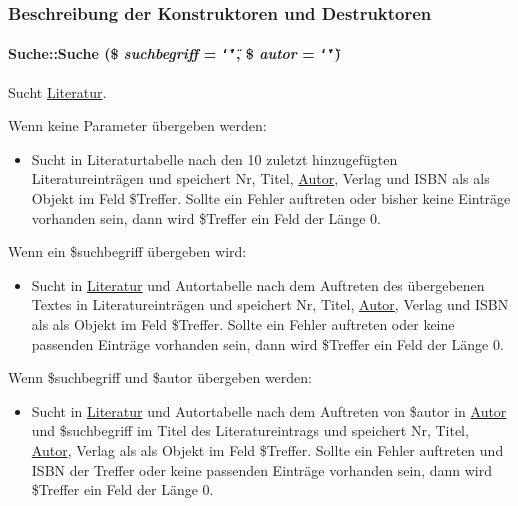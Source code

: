 \subsubsection{Beschreibung der Konstruktoren und Destruktoren}
\hypertarget{classSuche_277cd59d3689d6f0875d114be0024935}{
\paragraph[Suche]{\setlength{\rightskip}{0pt plus 5cm}Suche::Suche (\$ {\em suchbegriff} = {\tt \char`\"{}\char`\"{}}, \$ {\em autor} = {\tt \char`\"{}\char`\"{}})}\hfill}
\label{classSuche_277cd59d3689d6f0875d114be0024935}


Sucht \hyperlink{classLiteratur}{Literatur}. 

Wenn keine Parameter übergeben werden:\begin{itemize}
\item Sucht in Literaturtabelle nach den 10 zuletzt hinzugefügten Literatureinträgen und speichert Nr, Titel, \hyperlink{classAutor}{Autor}, Verlag und ISBN als als Objekt im Feld \$Treffer. Sollte ein Fehler auftreten oder bisher keine Einträge vorhanden sein, dann wird \$Treffer ein Feld der Länge 0.\end{itemize}


Wenn ein \$suchbegriff übergeben wird:\begin{itemize}
\item Sucht in \hyperlink{classLiteratur}{Literatur} und Autortabelle nach dem Auftreten des übergebenen Textes in Literatureinträgen und speichert Nr, Titel, \hyperlink{classAutor}{Autor}, Verlag und ISBN als als Objekt im Feld \$Treffer. Sollte ein Fehler auftreten oder keine passenden Einträge vorhanden sein, dann wird \$Treffer ein Feld der Länge 0.\end{itemize}


Wenn \$suchbegriff und \$autor übergeben werden:\begin{itemize}
\item Sucht in \hyperlink{classLiteratur}{Literatur} und Autortabelle nach dem Auftreten von \$autor in \hyperlink{classAutor}{Autor} und \$suchbegriff im Titel des Literatureintrags und speichert Nr, Titel, \hyperlink{classAutor}{Autor}, Verlag als als Objekt im Feld \$Treffer. Sollte ein Fehler auftreten und ISBN der Treffer oder keine passenden Einträge vorhanden sein, dann wird \$Treffer ein Feld der Länge 0.\end{itemize}


